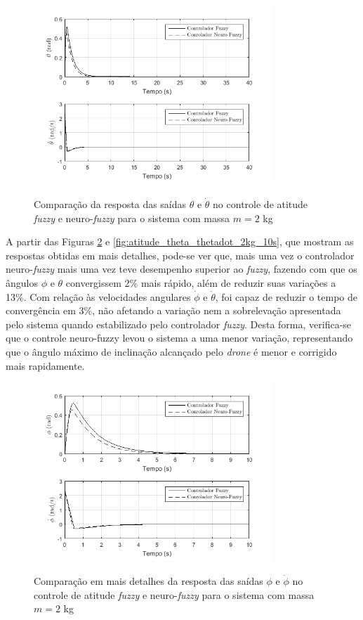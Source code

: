 \begin{figure}[!htb]
    \centering
    \caption{Comparação da resposta das saídas $\theta$ e $\dot{\theta}$ no controle de atitude \textit{fuzzy} e neuro-\textit{fuzzy} para o sistema com massa $m=2$ kg}
    \includegraphics[width=0.8\textwidth]{./04-figuras/resultados/novos/atitude_theta_thetadot_2kg_40s}
    \label{fig:atitude_theta_thetadot_2kg_40s}
\end{figure}

A partir das Figuras \ref{fig:atitude_phi_phidot_2kg_10s} e \ref{fig:atitude_theta_thetadot_2kg_10s}, que mostram as respostas obtidas em mais detalhes, pode-se ver que, mais uma vez o controlador neuro-\textit{fuzzy} mais uma vez teve desempenho superior ao \textit{fuzzy}, fazendo com que os ângulos $\phi$ e $\theta$ convergissem 2\% mais rápido, além de reduzir suas variações a 13\%. Com relação às velocidades angulares $\dot{\phi}$ e $\dot{\theta}$, foi capaz de reduzir o tempo de convergência em 3\%, não afetando a variação nem a sobrelevação apresentada pelo sistema quando estabilizado pelo controlador \textit{fuzzy}. Desta forma, verifica-se que o controle neuro-fuzzy levou o sistema a uma menor variação, representando que o ângulo máximo de inclinação alcançado pelo \textit{drone} é menor e corrigido mais rapidamente.

\begin{figure}[!htb]
    \centering
    \caption{Comparação em mais detalhes da resposta das saídas $\phi$ e $\dot{\phi}$ no controle de atitude \textit{fuzzy} e neuro-\textit{fuzzy} para o sistema com massa $m=2$ kg}
    \includegraphics[width=0.8\textwidth]{./04-figuras/resultados/novos/atitude_phi_phidot_2kg_10s}
    \label{fig:atitude_phi_phidot_2kg_10s}
\end{figure}

